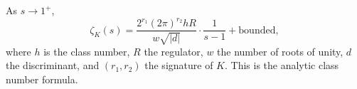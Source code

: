 As $s \to 1^+$,
$$\zeta_K(s) = \frac{2^{r_1}(2\pi)^{r_2} h R}{w\sqrt{|d|}} \cdot \frac{1}{s-1} + \text{bounded},$$
where $h$ is the class number, $R$ the regulator, $w$ the number of roots of unity, $d$ the discriminant, and $(r_1, r_2)$ the signature of $K$. This is the analytic class number formula.
